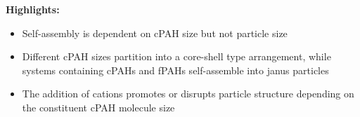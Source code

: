 \documentclass[como,a4paper,12pt,final]{Classes/c4e-preprint}
\begin{document}
\textbf{Highlights:}

\begin{itemize}
\item Self-assembly is dependent on cPAH size but not particle size
\item Different cPAH sizes partition into a core-shell type arrangement, while systems containing cPAHs and fPAHs self-assemble into janus particles
\item The addition of cations promotes or disrupts particle structure depending on the constituent cPAH molecule size
\end{itemize}

\vfill

\clearpage \setcounter{tocdepth}{3} \tableofcontents

\clearpage


\clearpage \appendix
{}


\clearpage \citeindexfalse

\end{document}
